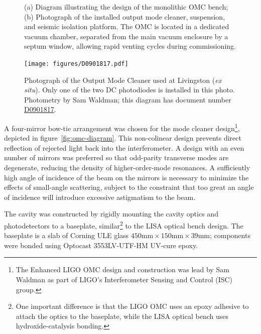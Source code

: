 \begin{figure}[t]
\caption[OMC diagram and photograph of installation]{
  (a) Diagram illustrating the design of the monolithic OMC
  bench; (b) Photograph of the installed output mode cleaner,
  suspension, and seismic isolation platform. The OMC is located in a
  dedicated vacuum chamber, separated from the main vacuum enclosure
  by a septum window, allowing rapid venting cycles during
  commissioning.}
\end{figure}
\begin{figure}
\texttt{[image: figures/D0901817.pdf]}
\caption[Output Mode Cleaner photograph]{Photograph of the Output Mode
  Cleaner used at Livingston (\emph{ex situ}).  Only one of the two DC
  photodiodes is installed in this photo.  Photometry by Sam Waldman;
  this diagram has document number
  \href{https://dcc.ligo.org/cgi-bin/private/DocDB/ShowDocument?docid=4713}{D0901817}.
}
\end{figure}


A four-mirror bow-tie arrangement was chosen for the mode cleaner
design\footnote{The Enhanced LIGO OMC design and construction was lead by
  Sam Waldman as part of LIGO's Interferometer Sensing and Control (ISC)
  group.}, depicted in figure~\ref{fig:omc-diagram}.  This non-colinear design prevents direct reflection of
rejected light back into the interferometer.  A design with an even
number of mirrors was preferred so that odd-parity transverse modes
are degenerate, reducing the density of higher-order-mode resonances.
A sufficiently high angle of incidence of the beam on the mirrors is
necessary to minimize the effects of small-angle scattering, subject
to the constraint that too great an angle of incidence will introduce
excessive astigmatism to the beam.

The cavity was constructed by rigidly mounting the cavity optics and
photodetectors to a baseplate, similar\footnote{One important
  difference is that the LIGO OMC uses an epoxy adhesive to attach the
  optics to the baseplate, while the LISA optical bench uses hydroxide-catalysis
  bonding\cite{Ressel2010Ultrastable,Elliffe2005Hydroxidecatalysis}.}
to the LISA optical bench design\cite{dArcio2010Optical}.
The baseplate is a slab of Corning ULE glass $450 \mathrm{mm}
\times 150 \mathrm{mm} \times \mathrm{39}\mathrm{mm}$; components were
bonded using Optocast {\sffamily 3553LV-UTF-HM} UV-cure epoxy.

